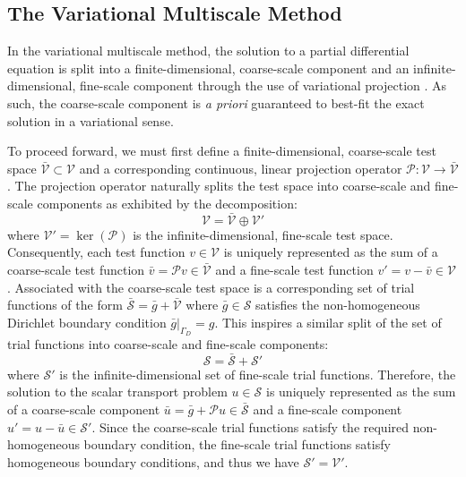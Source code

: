 \documentclass[11pt]{article}
\begin{document}
\subsection{The Variational Multiscale Method}
In the variational multiscale method, the solution to a partial differential equation is split into a finite-dimensional, coarse-scale component and an infinite-dimensional, fine-scale component through the use of variational projection \cite{Hughes07}.  As such, the coarse-scale component is \textit{a priori} guaranteed to best-fit the exact solution in a variational sense.

To proceed forward, we must first define a finite-dimensional, coarse-scale test space $\bar{\mathcal{V}} \subset \mathcal{V}$ and a corresponding continuous, linear projection operator $\mathcal{P}: \mathcal{V} \rightarrow \bar{\mathcal{V}}$.  The projection operator naturally splits the test space into coarse-scale and fine-scale components as exhibited by the decomposition:
$$\mathcal{V} = \bar{\mathcal{V}} \oplus \mathcal{V}'$$
where $\mathcal{V}' = \ker(\mathcal{P})$ is the infinite-dimensional, fine-scale test space.  Consequently, each test function $v \in \mathcal{V}$ is uniquely represented as the sum of a coarse-scale test function $\bar{v} = \mathcal{P}v \in \bar{\mathcal{V}}$ and a fine-scale test function $v' = v - \bar{v} \in \mathcal{V}$.  Associated with the coarse-scale test space is a corresponding set of trial functions of the form $\bar{\mathcal{S}} = \bar{g} + \bar{\mathcal{V}}$ where $\bar{g} \in \mathcal{S}$ satisfies the non-homogeneous Dirichlet boundary condition $\bar{g}|_{\Gamma_D} = g$.  This inspires a similar split of the set of trial functions into coarse-scale and fine-scale components:
$$\mathcal{S} = \bar{\mathcal{S}} + \mathcal{S}'$$
where $\mathcal{S}'$ is the infinite-dimensional set of fine-scale trial functions.  Therefore, the solution to the scalar transport problem $u \in \mathcal{S}$ is uniquely represented as the sum of a coarse-scale component $\bar{u} = \bar{g} + \mathcal{P}u \in \bar{\mathcal{S}}$ and a fine-scale component $u' = u - \bar{u} \in \mathcal{S}'$.  Since the coarse-scale trial functions satisfy the required non-homogeneous boundary condition, the fine-scale trial functions satisfy homogeneous boundary conditions, and thus we have $\mathcal{S}' = \mathcal{V}'$.  
\end{document}
